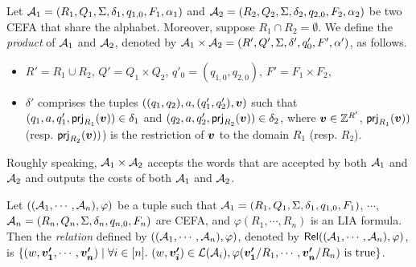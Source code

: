 Let $\mathcal{A}_1 = (R_1, Q_1, \Sigma, \delta_1, q_{1,0}, F_1, \alpha_1)$ and  $\mathcal{A}_2 = (R_2, Q_2, \Sigma, \delta_2, q_{2,0}, F_2, \alpha_2)$ be two CEFA that share the alphabet. Moreover, suppose $R_1 \cap R_2 = \emptyset$. We define the \emph{product} of $\mathcal{A}_1$ and $\mathcal{A}_2$, denoted by $\mathcal{A}_1 \times \mathcal{A}_2 = (R', Q', \Sigma, \delta', q'_0, F', \alpha')$, as follows. 
\begin{itemize}
\item $R' = R_1 \cup R_2$, $Q' = Q_1 \times Q_2$, $q'_0 = (q_{1,0}, q_{2,0})$, $F' = F_1 \times F_2$,
%
%
\item $\delta'$ comprises the tuples $((q_1, q_2), a, (q'_1, q'_2), \myvec{v})$ such that $(q_1,a, q'_1, \prj_{R_1}(\myvec{v})) \in \delta_1$ and $(q_2,a, q'_2, \prj_{R_2}(\myvec{v})) \in \delta_2$, where $\myvec{v} \in \Int^{R'}$, $\prj_{R_1}(\myvec{v}))$ (resp. $\prj_{R_2}(\myvec{v}))$) is the restriction of $\myvec{v}$ to the domain $R_1$ (resp. $R_2$). 
\end{itemize}
Roughly speaking, $\mathcal{A}_1 \times \mathcal{A}_2$ accepts the words that are accepted by both $\mathcal{A}_1$ and $\mathcal{A}_2$ and outputs the costs of both $\mathcal{A}_1$ and $\mathcal{A}_2$.  

Let $((\mathcal{A}_1,\cdots, \mathcal{A}_n), \varphi)$ be a tuple such that $\mathcal{A}_1 = (R_1, Q_1, \Sigma, \delta_1, q_{1,0}, F_1)$, $\cdots$, $\mathcal{A}_n = (R_n, Q_n, \Sigma, \delta_n, q_{n, 0}, F_n)$ are CEFA, and $\varphi(R_1, \cdots, R_n)$ is an LIA formula. Then the \emph{relation} defined by $((\mathcal{A}_1, \cdots, \mathcal{A}_n), \varphi)$, denoted by $\mathsf{Rel}((\mathcal{A}_1, \cdots, \mathcal{A}_n), \varphi)$, is $\{(w, \myvec{v'_1}, \cdots, \myvec{v'_n}) \mid \forall i \in [n].\ (w, \myvec{v'_i}) \in \Lang(\aut_i), \varphi(\myvec{v'_1}/R_1, \cdots, \myvec{v'_n}/R_n) \mbox{ is true}\}$.



